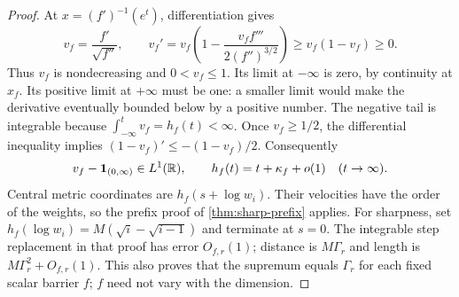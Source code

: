 \begin{proof}
At $x=(f')^{-1}(e^t)$, differentiation gives
\begin{equation}
 v_f=\frac{f'}{\sqrt{f''}},\qquad
 v_f'=v_f\left(1-\frac{v_f f'''}{2(f'')^{3/2}}\right)
 \geq v_f(1-v_f)\geq0.
 \label{eq:normalized-profile-ode}
\end{equation}
Thus $v_f$ is nondecreasing and $0<v_f\leq1$. Its limit at
$-\infty$ is zero, by continuity at $x_f$. Its positive limit at
$+\infty$ must be one: a smaller limit would make the derivative
eventually bounded below by a positive number. The negative tail is
integrable because $\int_{-\infty}^t v_f=h_f(t)<\infty$.
Once $v_f\geq1/2$, the differential inequality implies
$(1-v_f)'\leq-(1-v_f)/2$. Consequently
\begin{equation}
 v_f-\mathbf1_{(0,\infty)}\in L^1(\mathbb R),\qquad
 h_f(t)=t+\kappa_f+o(1)\quad(t\to\infty).
 \label{eq:general-profile-tails}
\end{equation}
Central metric coordinates are $h_f(s+\log w_i)$. Their velocities
have the order of the weights, so the prefix proof of
\cref{thm:sharp-prefix} applies. For sharpness, set
$h_f(\log w_i)=M(\sqrt i-\sqrt{i-1})$ and terminate at $s=0$.
The integrable step replacement in that proof has error $O_{f,r}(1)$;
distance is $M\Gamma_r$ and length is
$M\Gamma_r^2+O_{f,r}(1)$. This also proves that the supremum equals
$\Gamma_r$ for each fixed scalar barrier $f$; $f$ need not vary with the
dimension.


\end{proof}
